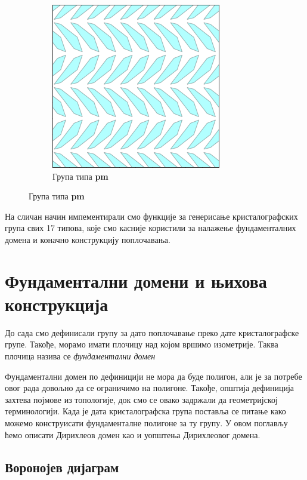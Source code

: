 \documentclass[12pt]{report}
\begin{document}
\begin{figure}
\begin{subfigure}[b]{0.3\textwidth}
    \includegraphics[width=.8\textwidth]{plavo_p3.png}
    \caption{Група типа \textbf{pm}}
    \label{fig:f5}
    
\end{subfigure}
\end{figure}



На сличан начин импементирали смо функције за генерисање кристалографских група свих 17 типова, које смо касније користили за налажење фундаменталних домена и коначно конструкцију поплочавања.

\chapter{Фундаментални домени и њихова конструкција}\label{dirihleova-fundamentalna-oblast} 

До сада смо дефинисали групу за дато поплочавање преко дате кристалографске групе. Такође, морамо имати плочицу над којом вршимо изометрије. Таква плочица назива се \emph{фундаментални домен}


Фундаментални домен по дефиницији не мора да буде
полигон, али је за потребе овог рада довољно да се ограничимо на
полигоне. Такође, општија дефиниција захтева појмове из топологије,
док смо се овако задржали да геометријској терминологији.
Када је дата кристалографска група поставља се питање како можемо конструисати фундаменталне полигоне за ту групу. У овом поглављу ћемо описати Дирихлеов домен као и уопштења Дирихлеовог домена.
\section{Воронојев дијаграм}
\end{document}
